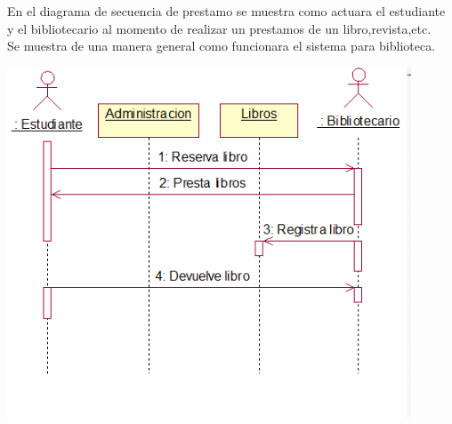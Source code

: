 \begin{enumerate}[1.]
    En el diagrama de secuencia de prestamo se muestra como actuara el estudiante y el bibliotecario al momento de realizar un prestamos de un libro,revista,etc.\\
    Se muestra de una manera general como funcionara el sistema para biblioteca.
	\begin{center}
	\includegraphics[width=12cm]{./Imagenes/img3} 
	\end{center}
	

\end{enumerate}
